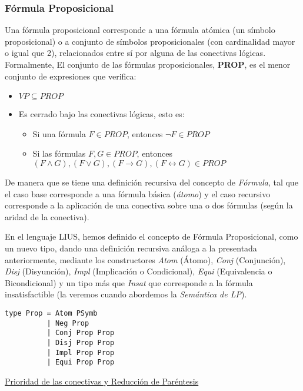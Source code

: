 \documentclass[a4paper]{report}
\begin{document}
\subsubsection{Fórmula Proposicional}

Una fórmula proposicional corresponde a una fórmula atómica (un símbolo proposicional) o a conjunto de símbolos proposicionales (con cardinalidad mayor o igual que 2), relacionados entre sí por alguna de las conectivas lógicas. Formalmente, El conjunto de las fórmulas proposicionales, \textbf{PROP}, es el menor conjunto de expresiones que verifica:

\begin{itemize}
\item $VP \subseteq PROP$
\item Es cerrado bajo las conectivas lógicas, esto es:
\begin{itemize}
\item Si una fórmula $F \in PROP$, entonces  $\neg F \in PROP$
\item Si las fórmulas $F, G \in PROP$, entonces  $(F \wedge G), (F \vee G), (F \rightarrow G), (F \leftrightarrow G) \in PROP$
\end{itemize}
\end{itemize}

De manera que se tiene una definición recursiva del concepto de \textit{Fórmula}, tal que el caso base corresponde a una fórmula básica (\textit{átomo}) y el caso recursivo corresponde a la aplicación de una conectiva sobre una o dos fórmulas (según la aridad de la conectiva). 

En el lenguaje LIUS, hemos definido el concepto de Fórmula Proposicional, como un nuevo tipo, dando una definición recursiva análoga a la presentada anteriormente, mediante los constructores \textit{Atom} (Átomo), \textit{Conj} (Conjunción), \textit{Disj} (Disyunción), \textit{Impl} (Implicación o Condicional), \textit{Equi} (Equivalencia o Bicondicional) y un tipo más que \textit{Insat} que corresponde a la fórmula insatisfactible (la veremos cuando abordemos la \textit{Semántica de LP}).\\

\begin{lstlisting}[caption= Definición del tipo Prop (Fórmula Proposicional).]
type Prop = Atom PSymb
          | Neg Prop
          | Conj Prop Prop
          | Disj Prop Prop
          | Impl Prop Prop
          | Equi Prop Prop
\end{lstlisting}

\noindent\underline{Prioridad de las conectivas y Reducción de Paréntesis}
\end{document}
